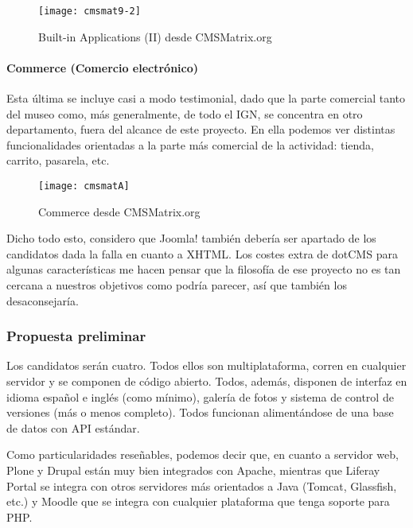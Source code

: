 \begin{figure}
\begin{narrow}{-0.15\linewidth}{-0.15\linewidth}
\centering
\texttt{[image: cmsmat9-2]}
\caption{Built-in Applications (II) desde CMSMatrix.org}
\end{narrow}
\end{figure}

\paragraph{Commerce (Comercio electrónico)}


\par Esta última se incluye casi a modo testimonial, dado que la parte comercial tanto del museo como, más generalmente, de todo el IGN, se concentra en otro departamento, fuera del alcance de este proyecto. En ella podemos ver distintas funcionalidades orientadas a la parte más comercial de la actividad: tienda, carrito, pasarela, etc.

\begin{figure}
\begin{narrow}{-0.15\linewidth}{-0.15\linewidth}
\centering
\texttt{[image: cmsmatA]}
\caption{Commerce desde CMSMatrix.org}
\end{narrow}
\label{fig:cmsmatA}
\end{figure}



\par Dicho todo esto, considero que Joomla! también debería ser apartado de los candidatos dada la falla en cuanto a XHTML. Los costes extra de dotCMS para algunas características me hacen pensar que la filosofía de ese proyecto no es tan cercana a nuestros objetivos como podría parecer, así que también los desaconsejaría.


\subsubsection{Propuesta preliminar}
\par Los candidatos serán cuatro. Todos ellos son multiplataforma, corren en cualquier servidor y se componen de código abierto. Todos, además, disponen de interfaz en idioma español e inglés (como mínimo), galería de fotos y sistema de control de versiones (más o menos completo). Todos funcionan alimentándose de una base de datos con API estándar.
\par Como particularidades reseñables, podemos decir que, en cuanto a servidor web, Plone y Drupal están muy bien integrados con Apache, mientras que Liferay Portal se integra con otros servidores más orientados a Java (Tomcat, Glassfish, etc.) y Moodle que se integra con cualquier plataforma que tenga soporte para PHP.

